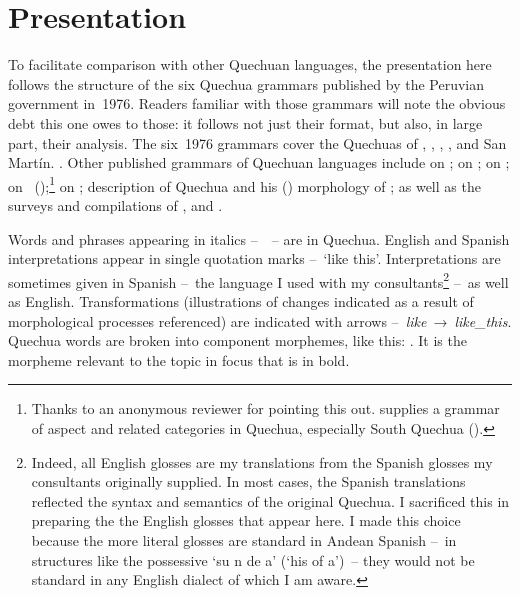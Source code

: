 \section{Presentation}\label{sec:presentation}
To facilitate comparison with other Quechuan languages, the presentation here follows the structure of the six Quechua grammars published by the Peruvian government in~1976. Readers familiar with those grammars will note the obvious debt this one owes to those: it follows not just their format, but also, in large part, their analysis. The six~1976 grammars cover the Quechuas of , , , ,  and San Martín. \citep{Parker76gram,Soto76a,Quesada76,Cusihuaman76,CerroP76a,Coombs76}. Other published grammars of Quechuan languages include \citet{Herrero78} on ; \citet{Catta94} on ; \citet{Taylor94a} on ; \citet{Weber89} on ~();\footnote{Thanks to an anonymous reviewer for pointing this out. \citet{Hintz} supplies a grammar of aspect and related categories in Quechua, especially South  Quechua ().} \citet{Cole82} on ; \citet{Adelaar77} description of  Quechua and his (\citeyear{Adelaar86}) morphology of ; 
as well as the surveys and compilations of \citet{CerroP87,CerroP90}, and \citet{Cole94}.

Words and phrases appearing in italics --~~-- are in Quechua. English and Spanish interpretations appear in single quotation marks --~‘like this’. Interpretations are sometimes given in Spanish --~the language I used with my consultants\footnote{Indeed, all English glosses are my translations from the Spanish glosses my consultants originally supplied. In most cases, the Spanish translations reflected the syntax and semantics of the original Quechua. I sacrificed this in preparing the the English glosses that appear here. I made this choice because the more literal glosses are standard in Andean Spanish --~in structures like the possessive ‘su n de a’ (‘his  of a’)~-- they would not be standard in any English dialect of which I am aware.} --~as well as English. Transformations (illustrations of changes indicated as a result of morphological processes referenced) are indicated with arrows --~\textit{like}~→~\textit{like\_this}. Quechua words are broken into component morphemes, like this: . It is the morpheme relevant to the topic in focus that is in bold. 

